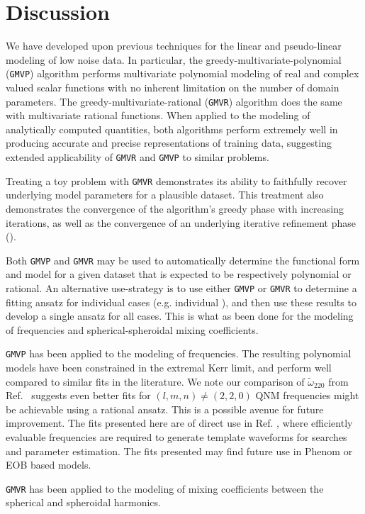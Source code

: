 \documentclass[twocolumn,aps,prd,floatfix,preprintnumbers,a4paper,nofootinbib,
superscriptaddress,10pt]{revtex4-1}
\newcommand{\cw}{\tilde{\omega}}
\def\gmvp#1{greedy-multivariate-polynomial#1
  (\texttt{GMVP}#1)\gdef\gmvp{\texttt{GMVP}}}
\def\gmvr#1{greedy-multivariate-rational#1
  (\texttt{GMVR}#1)\gdef\gmvr{\texttt{GMVR}}}
\begin{document}
\section{Discussion}
\label{discuss}
%
\par We have developed upon previous techniques for the linear and pseudo-linear modeling of low noise data.
%
In particular, the \gmvp{} algorithm performs multivariate polynomial modeling of real and complex valued scalar functions with no inherent limitation on the number of domain parameters.
%
The \gmvr{} algorithm does the same with multivariate rational functions.
%
When applied to the modeling of analytically computed quantities, both algorithms perform extremely well in producing accurate and precise representations of training data, suggesting extended applicability of \gmvr{} and \gmvp{} to similar problems.
%
\par Treating a toy problem with \gmvr{} demonstrates its ability to faithfully recover underlying model parameters for a plausible dataset.
%
This treatment also demonstrates the convergence of the algorithm's greedy phase with increasing iterations, as well as the convergence of an underlying iterative refinement phase ().
%
%
%
\par Both \gmvp{} and \gmvr{} may be used to automatically determine the functional form and model for a given dataset that is expected to be respectively polynomial or rational.
%
An alternative use-strategy is to use either \gmvp{} or \gmvr{} to determine a fitting ansatz for individual cases (e.g. individual ), and then use these results to develop a single ansatz for all cases.
%
This is what as been done for the modeling of \qnm{} frequencies and spherical-spheroidal mixing coefficients.
%
%
\par \gmvp{} has been applied to the modeling of \qnm{} frequencies. The resulting polynomial models have been constrained in the extremal Kerr limit, and perform well compared to similar fits in the literature. We note our comparison of $\cw_{220}$ from Ref.~\cite{Nagar:2018zoe} suggests even better fits for $(l,m,n)\neq(2,2,0)$ QNM frequencies might be achievable using a rational ansatz. This is a possible avenue for future improvement.
%
The fits presented here are of direct use in Ref. \cite{London:2017bcn}, where efficiently evaluable \qnm{} frequencies are required to generate template waveforms for \gw{} searches and parameter estimation.
%
The fits presented may find future use in Phenom or EOB based \gw{} models.
%
\par \gmvr{} has been applied to the modeling of mixing coefficients between the spherical and spheroidal harmonics.
\end{document}
